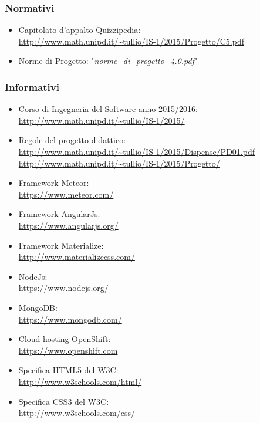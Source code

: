 \documentclass[a4paper,11pt]{article}
\begin{document}
		\subsubsection{Normativi}

		\begin{itemize}
			\item Capitolato d'appalto Quizzipedia:\\
			\url{http://www.math.unipd.it/~tullio/IS-1/2015/Progetto/C5.pdf}
			\item Norme di Progetto: "\textit{norme\_di\_progetto\_4.0.pdf}"
		\end{itemize}
		\subsubsection{Informativi}
		\begin{itemize}
			\item Corso di Ingegneria del Software anno 2015/2016:\\
			\url{http://www.math.unipd.it/~tullio/IS-1/2015/}
			\item Regole del progetto didattico:\\
			\url{http://www.math.unipd.it/~tullio/IS-1/2015/Dispense/PD01.pdf}
			\url{http://www.math.unipd.it/~tullio/IS-1/2015/Progetto/}\\
			\item Framework Meteor:\\
			\url{https://www.meteor.com/}
			\item Framework AngularJs:\\
			\url{https://www.angularjs.org/}
			\item Framework Materialize:\\
			\url{http://www.materializecss.com/}
			\item NodeJs:\\
			\url{https://www.nodejs.org/}
			\item MongoDB:\\
			\url{https://www.mongodb.com/}
			\item Cloud hosting OpenShift:\\
			\url{https://www.openshift.com}
			\item Specifica HTML5 del W3C:\\
			\url{http://www.w3schools.com/html/}
			\item Specifica CSS3 del W3C:\\
			\url{http://www.w3schools.com/css/}
			\end{itemize}
	\pagebreak
	\newpage
\end{document}
